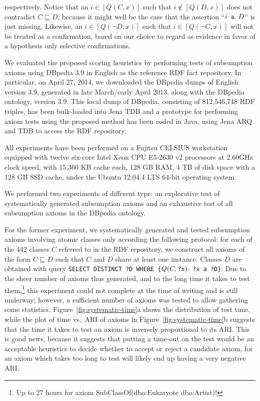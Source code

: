 \documentclass{llncs}
\begin{document}
respectively.
Notice that an $i \in [Q(C, x)]$ such that $i \notin [Q(D, x)]$
does not contradict $C \sqsubseteq D$, because it might well be the case
that the assertion ``$i \mbox{\tt\ a } D$'' is just missing.
Likewise, an $i \in [Q(\neg D, x)]$ such that $i \in [Q(\neg C, x)]$
will not be treated as a confirmation, based on our choice to regard as
evidence in favor of a hypothesis only selective confirmations.

We evaluated the proposed scoring heuristics by performing tests of subsumption
axioms using DBpedia 3.9 in English as the reference RDF fact repository.
In particular, on April 27, 2014, we downloaded the DBpedia dumps of English version 3.9,
generated in late March/early April 2013, along with the DBpedia ontology, version 3.9.
This local dump of DBpedia, consisting of 812,546,748 RDF triples,
has been bulk-loaded into Jena TDB and a prototype
for performing axiom tests using the proposed method has been coded in Java,
using Jena ARQ and TDB to access the RDF repository.

All experiments have been performed on a Fujitsu CELSIUS workstation equipped
with twelve six-core Intel Xeon CPU E5-2630 v2 processors at 2.60GHz clock speed,
with 15,360 KB cache each, 128 GB RAM,
4 TB of disk space with a 128 GB SSD cache,
under the Ubuntu  12.04.4 LTS 64-bit operating system.


We performed two experiments of different type: an explorative test of systematically
generated subsumption axioms and an exhaustive test of all subsumption axioms
in the DBpedia ontology.

For the former experiment, we systematically generated and tested subsumption axioms
involving atomic classes only according the following protocol:
for each of the 442 classes $C$ referred to in the RDF repository, we construct all axioms of the form
$C \sqsubseteq D$ such that $C$ and $D$ share at least one instance. Classes $D$ are obtained
with query \texttt{SELECT DISTINCT ?D WHERE \{}$Q(C, \mbox{\tt ?x})$. \texttt{?x a ?D\}}.
Due to the sheer number of axioms thus generated, and to the long time
it takes to test them,\footnote{Up to 27 hours for axiom \textsf{SubClassOf}(\textsf{dbo:Eukaryote} \textsf{dbo:Artist})!}
this experiment could not complete at the time of writing and is still underway;
however, a sufficient number of axioms was tested to allow gathering some statistics.
Figure~\ref{fig:systematic-time}a shows the distribution of test time,
while the plot of time vs.\ ARI of axioms in Figure~\ref{fig:systematic-time}b
suggests that the time it takes to test an axiom is inversely proportional to its
ARI. This is good news, because it suggests that putting a time-out
on the test would be an acceptable heuristics to decide whether to accept or reject
a candidate axiom, for an axiom which takes too long to test will likely end up
having a very negative ARI.
\end{document}
